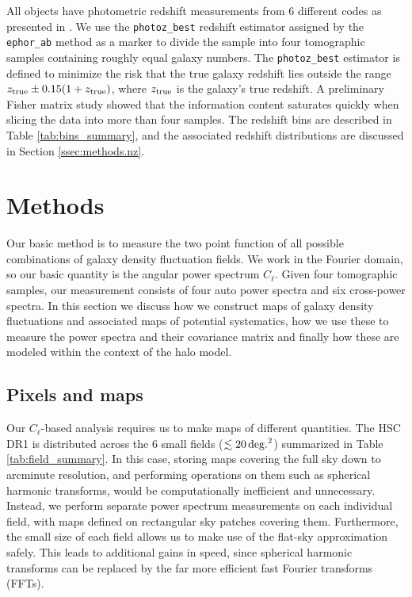\documentclass[a4paper,11pt]{article}
\begin{document}
  All objects have photometric redshift measurements from 6 different codes as presented in \cite{2018PASJ...70S...9T}. We use the {\tt photoz\_best} redshift estimator assigned by the {\tt ephor\_ab} method as a marker to divide the sample into four tomographic samples containing roughly equal galaxy numbers. The {\tt photoz\_best} estimator is defined to minimize the risk that the true galaxy redshift lies outside the range $z_{\rm true}\pm 0.15(1+z_{\rm true})$, where $z_{\rm true}$ is the galaxy's true redshift. A preliminary Fisher matrix study showed that the information content saturates quickly when slicing the data into more than four samples. The redshift bins are described in Table \ref{tab:bins_summary}, and the associated redshift distributions are discussed in Section \ref{ssec:methods.nz}.

\section{Methods}\label{sec:methods}

Our basic method is to measure the two point function of all possible combinations of galaxy density fluctuation fields. We work in the Fourier domain, so our basic quantity is the angular power spectrum $C_\ell$. Given four tomographic samples, our measurement consists of four auto power spectra and six cross-power spectra. In this section we discuss how we construct maps of galaxy density fluctuations and associated maps of potential systematics, how we use these to measure the power spectra and their covariance matrix and finally how these are modeled within the context of the halo model.


  \subsection{Pixels and maps}\label{ssec:methods.pix}
    Our $C_\ell$-based analysis requires us to make maps of different quantities. The HSC DR1 is distributed across the 6 small fields ($\lesssim20\,{\rm deg.}^2$) summarized in Table \ref{tab:field_summary}. In this case, storing maps covering the full sky down to arcminute resolution, and performing operations on them such as spherical harmonic transforms, would be computationally inefficient and unnecessary. Instead, we perform separate power spectrum measurements on each individual field, with maps defined on rectangular sky patches covering them. Furthermore, the small size of each field allows us to make use of the flat-sky approximation safely. This leads to additional gains in speed, since spherical harmonic transforms can be replaced by the far more efficient fast Fourier transforms (FFTs).
    
\end{document}
